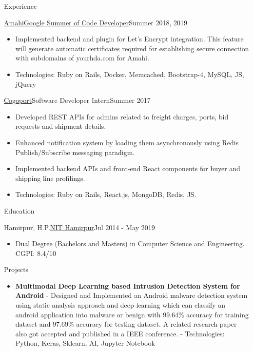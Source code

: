 \documentclass[]{mcdowellcv}
\begin{document}
\begin{cvsection}{Experience}
\begin{cvsubsection}{\href {https://www.amahi.org/}{Amahi}}{\href {https://summerofcode.withgoogle.com/}{Google Summer of Code Developer}}{Summer 2018, 2019}
\begin{itemize}
				\item Implemented backend and plugin for Let's Encrypt integration. This feature will generate automatic certificates required for establishing secure connection with subdomains of yourhda.com for Amahi.
				\item Technologies: Ruby on Rails, Docker, Memcached, Bootstrap-4, MySQL, JS, jQuery
			\end{itemize}
		\end{cvsubsection}
		\begin{cvsubsection}{\href {http://www.cogoport.com/}{Cogoport}}{Software Developer Intern}{Summer 2017}			
			\begin{itemize}
				\item Developed REST APIs for admins related to freight charges, ports, bid requests and shipment details.
				\item Enhanced notification system by loading them asynchronously using Redis Publish/Subscribe messaging paradigm.
				\item Implemented backend APIs and front-end React components for buyer and shipping line profilings.
				\item Technologies: Ruby on Rails, React.js, MongoDB, Redis, JS.
			\end{itemize}
		\end{cvsubsection}
	\end{cvsection}
	
	\begin{cvsection}{Education}
		\begin{cvsubsection}{Hamirpur, H.P.}{\href {http://nith.ac.in/}{NIT Hamirpur}}{Jul 2014 - May 2019}
			\begin{itemize}
				\item Dual Degree (Bachelors and Masters) in Computer Science and Engineering. CGPI: 8.4/10
			\end{itemize}
		\end{cvsubsection}
	\end{cvsection}
	
	\begin{cvsection}{Projects}
		\begin{cvsubsection}{}{}{}
			\begin{itemize}
				\item \textbf{Multimodal Deep Learning based Intrusion Detection System for Android}
				\newline- Designed and Implemented an Android malware detection system using static analysis approach and deep learning which can classify an android application into malware or benign with 99.64\% accuracy for training dataset and 97.69\% accuracy for testing dataset. A related research paper also got accepted and published in a IEEE conference.
				\newline- Technologies: Python, Keras, Sklearn, AI, Jupyter Notebook
			\end{itemize}
		\end{cvsubsection}
	\end{cvsection}
\end{document}
